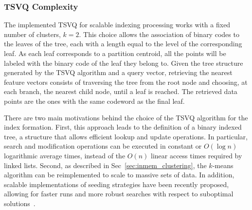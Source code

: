 \subsubsection{TSVQ Complexity}
\label{sec:TSVQComplexity}
The implemented TSVQ for scalable indexing processing works with a fixed number of clusters, $k=2$. This choice allows the association of binary codes to the leaves of the tree, each with a length equal to the level of the corresponding leaf. 
As each leaf corresponds to a partition centroid, all the points will be labeled with the binary code of the leaf they belong to.
Given the tree structure generated by the TSVQ algorithm and a query vector, retrieving the nearest feature vectors consists of traversing the tree from the root node and choosing, at each branch, the nearest child node, until a leaf is reached. The retrieved data points are the ones with the same codeword as the final leaf.

There are two main motivations behind the choice of the TSVQ algorithm for the index formation. First, this approach leads to the definition of a binary indexed tree, a structure that allows efficient lookup and update operations. 
In particular, search and modification operations can be executed in constant or $O(\log n)$ logarithmic average times, instead of the $O(n)$ linear access times required by linked lists. 
Second, as described in Sec~\ref{sec:inmem_clustering}, the \mbox{$k$-means} algorithm can be reimplemented to scale to massive sets of data.
In addition, scalable implementations of seeding strategies have been recently proposed, allowing for faster runs and more robust searches with respect to suboptimal solutions~\cite{bahmani2012scalable}. 

%
